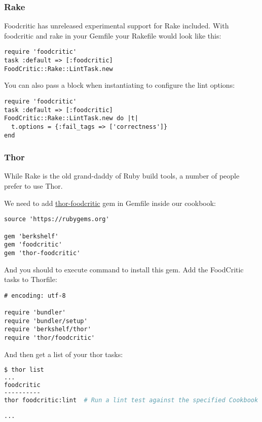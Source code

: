 \subsubsection{Rake}

Foodcritic has unreleased experimental support for Rake included. With foodcritic and rake in your Gemfile your Rakefile would look like this:

\begin{lstlisting}[label=lst:testing-rake1]
require 'foodcritic'
task :default => [:foodcritic]
FoodCritic::Rake::LintTask.new
\end{lstlisting}

You can also pass a block when instantiating to configure the lint options:

\begin{lstlisting}[label=lst:testing-rake2]
require 'foodcritic'
task :default => [:foodcritic]
FoodCritic::Rake::LintTask.new do |t|
  t.options = {:fail_tags => ['correctness']}
end
\end{lstlisting}

\subsubsection{Thor}

While Rake is the old grand-daddy of Ruby build tools, a number of people prefer to use Thor.

We need to add \href{https://github.com/reset/thor-foodcritic}{thor-foodcritic} gem in Gemfile inside our  cookbook:

\begin{lstlisting}[label=lst:testing-thor1]
source 'https://rubygems.org'

gem 'berkshelf'
gem 'foodcritic'
gem 'thor-foodcritic'
\end{lstlisting}

And you should to execute  command to install this gem. Add the FoodCritic tasks to Thorfile:

\begin{lstlisting}[label=lst:testing-thor2]
# encoding: utf-8

require 'bundler'
require 'bundler/setup'
require 'berkshelf/thor'
require 'thor/foodcritic'
\end{lstlisting}

And then get a list of your thor tasks:

\begin{lstlisting}[language=Bash,label=lst:testing-thor3]
$ thor list
...
foodcritic
----------
thor foodcritic:lint  # Run a lint test against the specified Cookbook and Role paths or otherwise your current working directory.

...
\end{lstlisting}

